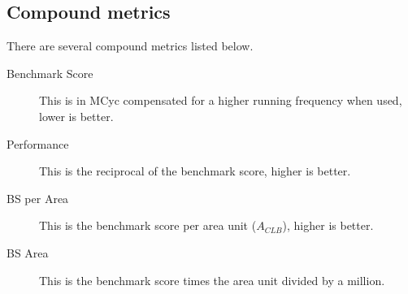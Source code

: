 \documentclass[final]{article}
\begin{document}
\subsection{Compound metrics}
There are several compound metrics listed below.
\begin{description}

    \item[Benchmark Score] This is in MCyc compensated for a higher running frequency when used, lower is better.
    \item[Performance] This is the reciprocal of the benchmark score, higher is better.
    \item[BS per Area] This is the benchmark score per area unit ($A_{CLB}$), higher is better.
    \item[BS Area] This is the benchmark score times the area unit divided by a million.

\end{description}
\end{document}
